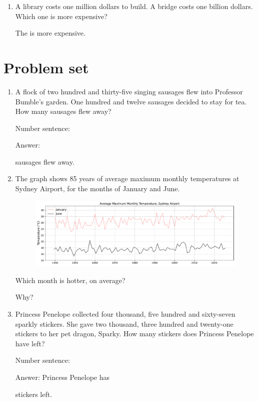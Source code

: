 \documentclass{tufte-book}
\begin{document}
\begin{enumerate}
\item A library costs one million dollars to build. A bridge costs one billion dollars. Which one is more expensive?\medskip\par
The \dotfill\medskip is more expensive.

\end{enumerate}

\clearpage\section{Problem set }

\begin{enumerate}
\item A flock of two hundred and thirty-five singing sausages flew into Professor Bumble's garden. One hundred and twelve sausages decided to stay for tea. How many sausages flew away?\medskip\par
Number sentence: \dotfill\medskip\par
Answer: 
\dotfill\medskip\par\mbox{}\dotfill\medskip\par\mbox{}\dotfill\bigskip
 sausages flew away.

\item The graph shows 85 years of average maximum monthly temperatures at Sydney Airport, for the months of January and June.
\begin{figure}[h]\includegraphics[width=1.5\textwidth]{fig/line_max_monthly_temp_syd.pdf}\end{figure}

Which month is hotter, on average?\medskip\dotfill\par
Why? \dotfill\medskip\par\mbox{}\dotfill\medskip\par\mbox{}\dotfill\bigskip

\item Princess Penelope collected four thousand, five hundred and sixty-seven sparkly stickers. She gave two thousand, three hundred and twenty-one stickers to her pet dragon, Sparky. How many stickers does Princess Penelope have left?\medskip\par
Number sentence: \dotfill\medskip\par
Answer: Princess Penelope has 
\dotfill\medskip\par\mbox{}\dotfill\medskip\par\mbox{}\dotfill\bigskip
 stickers left.

\end{enumerate}
\end{document}

